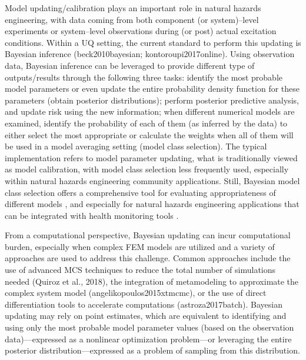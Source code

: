 Model updating/calibration plays an important role in natural hazards engineering, with data coming from both component (or system)–level experiments or system–level observations during (or post) actual excitation conditions. Within a UQ setting, the current standard to perform this updating is Bayesian inference (beck2010bayesian; kontoroupi2017online). Using observation data, Bayesian inference can be leveraged to provide different type of outputs/results \citep{beck2013prior} through the following three tasks: identify the most probable model parameters or even update the entire probability density function for these parameters (obtain posterior distributions); perform posterior predictive analysis, and update risk using the new information; when different numerical models are examined, identify the probability of each of them (as inferred by the data) to either select the most appropriate or calculate the weights when all of them will be used in a model averaging setting (model class selection). The typical implementation refers to model parameter updating, what is traditionally viewed as model calibration, with model class selection less frequently used, especially within natural hazards engineering community applications. Still, Bayesian model class selection offers a comprehensive tool for evaluating appropriateness of different models \citep{muto2008bayesian}, and especially for natural hazards engineering applications that can be integrated with health monitoring tools \citep{oh2018bayesian}.

From a computational perspective, Bayesian updating can incur computational burden, especially when complex FEM models are utilized and a variety of approaches are used to address this challenge. Common approaches include the use of advanced MCS techniques to reduce the total number of simulations needed (Quiroz et al., 2018), the integration of metamodeling to approximate the complex system model (angelikopoulos2015xtmcmc), or the use of direct differentiation tools to accelerate computations (astroza2017batch). Bayesian updating may rely on point estimates, which are equivalent to identifying and using only the most probable  model parameter values (based on the observation data)—expressed as a nonlinear optimization problem—or leveraging the entire posterior distribution—expressed as a problem of sampling from this distribution.

